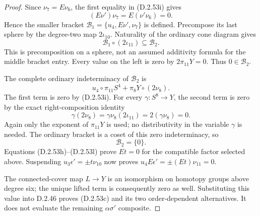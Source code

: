 \begin{proof}
Since $\nu_7=E\nu_6$, the first equality in
\textup{(D.2.53i)} gives
\[
                    (E\nu')\nu_7=E(\nu'\nu_6)=0.
\]
Hence the smaller bracket
$\mathcal B_1=\{u_4,E\nu',\nu_7\}$ is defined.
Precompose its last sphere by the degree-two map
$2\iota_{10}$.  Naturality of the ordinary cone diagram
gives
\[
                    \mathcal B_1\circ(2\iota_{11})
                               \subseteq\mathcal B_2.
                    \tag{D.2.53j}
\]
This is precomposition on a sphere, not an assumed
additivity formula for the middle bracket entry.
Every value on the left is zero by $2\pi_{11}Y=0$.
Thus $0\in\mathcal B_2$.

The complete ordinary indeterminacy of $\mathcal B_2$ is
\[
                 u_4\circ\pi_{11}S^4
                     +\pi_8Y\circ(2\nu_8).
                 \tag{D.2.53k}
\]
The first term is zero by \textup{(D.2.53i)}.
For every $\gamma:S^8\to Y$, the second term is zero
by the exact right-composition identity
\[
              \gamma(2\nu_8)
                  =\gamma\nu_8(2\iota_{11})
                  =2(\gamma\nu_8)=0.
\]
Again only the exponent of $\pi_{11}Y$ is used; no
distributivity in the variable $\gamma$ is needed.
The ordinary bracket is a coset of this zero
indeterminacy, so
\[
                            \mathcal B_2=\{0\}.
                            \tag{D.2.53l}
\]
Equations \textup{(D.2.53h)--(D.2.53l)} prove $Et=0$
for the compatible factor selected above.  Suspending
$u_3\epsilon'=\pm t\nu_{10}$ now proves
$u_4E\epsilon'=\pm(Et)\nu_{11}=0$.

The connected-cover map $L\to Y$ is an isomorphism on
homotopy groups above degree six; the unique lifted
term is consequently zero as well.  Substituting this
value into D.2.46 proves \textup{(D.2.53c)} and its
two order-dependent alternatives.  It does not
evaluate the remaining $\alpha\sigma'$ composite.
\end{proof}

